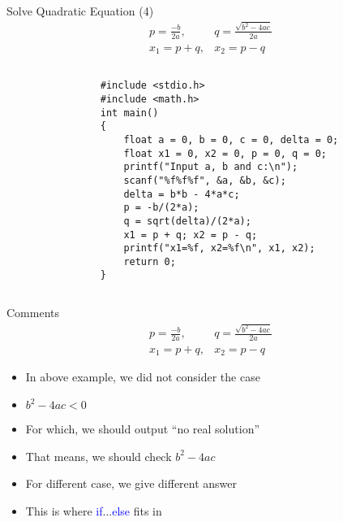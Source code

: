 \begin{frame}[fragile]{Solve Quadratic Equation (4)}
\vspace{-0.3in}
\begin{eqnarray}
p=\frac{-b}{2a}, & q=\frac{\sqrt{b^2-4ac}}{2a} \nonumber \\
x_1=p+q, & x_2=p-q \nonumber
\end{eqnarray}
\vspace{-0.4in}
	\begin{columns}
		\begin{column}{0.1\linewidth}
		\end{column}
		\begin{column}{0.9\linewidth}
	\begin{lstlisting}[]
#include <stdio.h>
#include <math.h>
int main()
{
    float a = 0, b = 0, c = 0, delta = 0;
    float x1 = 0, x2 = 0, p = 0, q = 0;
    printf("Input a, b and c:\n");
    scanf("%f%f%f", &a, &b, &c);
    delta = b*b - 4*a*c;
    p = -b/(2*a);
    q = sqrt(delta)/(2*a);
    x1 = p + q; x2 = p - q;
    printf("x1=%f, x2=%f\n", x1, x2);
    return 0;
}
	\end{lstlisting}
	\end{column}
\end{columns}
\end{frame}

\begin{frame}[fragile]{Comments}
\vspace{-0.3in}
\begin{eqnarray}
p=\frac{-b}{2a}, & q=\frac{\sqrt{b^2-4ac}}{2a} \nonumber \\
x_1=p+q, & x_2=p-q \nonumber
\end{eqnarray}
\begin{itemize}
	\item {In above example, we did not consider the case}
	\item {${b^2-4ac} < 0$}
	\item {For which, we should output ``no real solution''}
	\item {That means, we should check ${b^2-4ac}$}
	\item {For different case, we give different answer}
	\item {This is where \textcolor{blue}{if}...\textcolor{blue}{else} fits in}
\end{itemize}

\end{frame}

